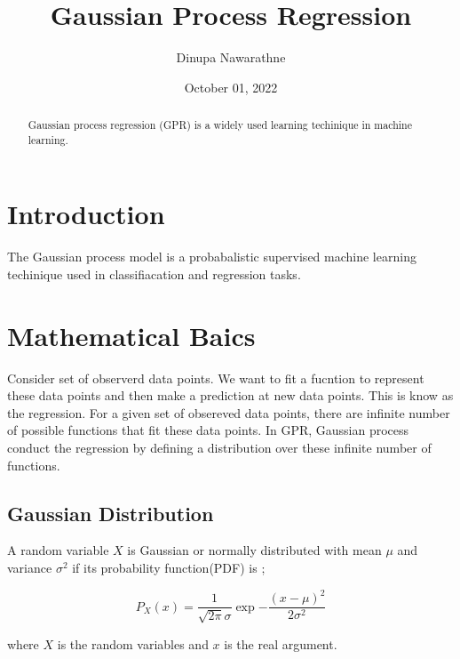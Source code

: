\documentclass{article}
\title{Gaussian Process Regression}
\author{Dinupa Nawarathne}
\date{October 01, 2022}
\begin{document}
\maketitle

\begin{abstract}
Gaussian process regression (GPR) is a widely used learning techinique in machine learning.
\end{abstract}

\section{Introduction}

The Gaussian process model is a probabalistic supervised machine learning techinique used in classifiacation and regression tasks.

\section{Mathematical Baics}

Consider set of observerd data points. We want to fit a fucntion to represent these data points and then make a prediction at new data points. This is know as the regression. For a given set of obsereved data points, there are infinite number of possible functions that fit these data points. In GPR, Gaussian process conduct the regression by defining a distribution over these infinite number of functions.

\subsection{Gaussian Distribution}

A random variable $X$ is Gaussian or normally distributed with mean $\mu$ and variance $\sigma^{2}$ if its probability function(PDF) is \cite{kevin};

\begin{equation}
P_{X}(x) = \frac{1}{\sqrt{2\pi}\sigma}\exp{-\frac{(x-\mu)^{2}}{2\sigma^{2}}}
\end{equation}

where $X$ is the random variables and $x$ is the real argument.

% 
% 
\end{document}
